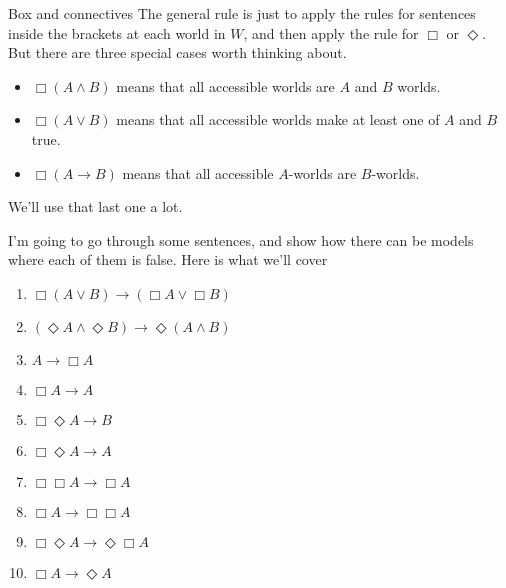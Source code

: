\documentclass[
  14pt,
  letterpaper,
  ignorenonframetext,
  aspectratio=169,
  handout]{beamer}
\providecommand{\tightlist}{%
  \setlength{\itemsep}{0pt}\setlength{\parskip}{0pt}}\usepackage{longtable,booktabs,array}
\begin{document}
\begin{frame}{Box and connectives}
\protect\hypertarget{box-and-connectives}{}
The general rule is just to apply the rules for sentences inside the
brackets at each world in \(W\), and then apply the rule for \(\Box\) or
\(\Diamond\). But there are three special cases worth thinking about.

\begin{itemize}[<+->]
\tightlist
\item
  \(\Box(A \wedge B)\) means that all accessible worlds are \(A\) and
  \(B\) worlds.
\item
  \(\Box(A \vee B)\) means that all accessible worlds make at least one
  of \(A\) and \(B\) true.
\item
  \(\Box(A \rightarrow B)\) means that all accessible \(A\)-worlds are
  \(B\)-worlds.
\end{itemize}

We'll use that last one a lot.
\end{frame}

\begin{frame}
I'm going to go through some sentences, and show how there can be models
where each of them is false. Here is what we'll cover

\begin{enumerate}[<+->]
\tightlist
\item
  \(\Box(A \vee B) \rightarrow (\Box A \vee \Box B)\)
\item
  \((\Diamond A \wedge \Diamond B) \rightarrow \Diamond (A \wedge B)\)
\item
  \(A \rightarrow \Box A\)
\item
  \(\Box A \rightarrow A\)
\item
  \(\Box \Diamond A \rightarrow B\)
\item
  \(\Box \Diamond A \rightarrow A\)
\item
  \(\Box \Box A \rightarrow \Box A\)
\item
  \(\Box A \rightarrow \Box \Box A\)
\item
  \(\Box \Diamond A \rightarrow \Diamond \Box A\)
\item
  \(\Box A \rightarrow \Diamond A\)
\end{enumerate}
\end{frame}
\end{document}
